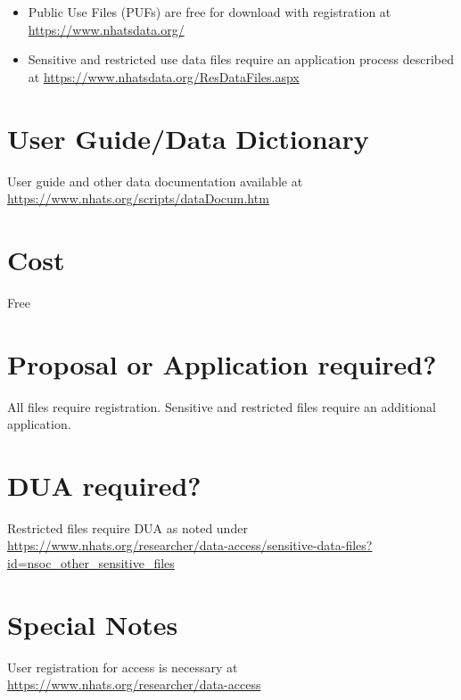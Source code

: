 \documentclass[
]{book}
\providecommand{\tightlist}{%
  \setlength{\itemsep}{0pt}\setlength{\parskip}{0pt}}
\begin{document}
\begin{itemize}
\tightlist
\item
  Public Use Files (PUFs) are free for download with registration at \url{https://www.nhatsdata.org/}
\item
  Sensitive and restricted use data files require an application process described at \url{https://www.nhatsdata.org/ResDataFiles.aspx}
\end{itemize}

\hypertarget{user-guidedata-dictionary-48}{%
\section{User Guide/Data Dictionary}\label{user-guidedata-dictionary-48}}

User guide and other data documentation available at \url{https://www.nhats.org/scripts/dataDocum.htm}

\hypertarget{cost-48}{%
\section{Cost}\label{cost-48}}

Free

\hypertarget{proposal-or-application-required-48}{%
\section{Proposal or Application required?}\label{proposal-or-application-required-48}}

All files require registration. Sensitive and restricted files require an additional application.

\hypertarget{dua-required-48}{%
\section{DUA required?}\label{dua-required-48}}

Restricted files require DUA as noted under \url{https://www.nhats.org/researcher/data-access/sensitive-data-files?id=nsoc_other_sensitive_files}

\hypertarget{special-notes-48}{%
\section{Special Notes}\label{special-notes-48}}

User registration for access is necessary at \url{https://www.nhats.org/researcher/data-access}
\end{document}

